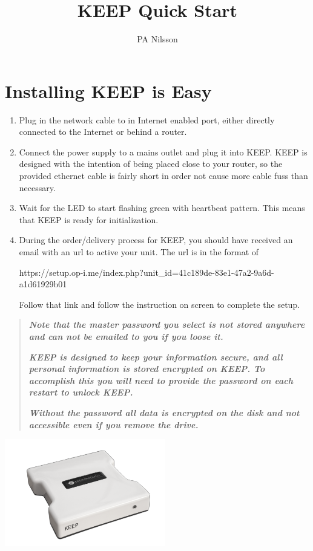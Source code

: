 \documentclass[12pt,a4paper,titlepage]{article}
\author{PA Nilsson}
\title{KEEP Quick Start}
\begin{document}
\FloatBarrier
\section{Installing KEEP is Easy}
	\begin{enumerate}

		\item Plug in the network cable to in Internet enabled port, either directly connected to the Internet or behind a router.

		\item Connect the power supply to a mains outlet and plug it into KEEP. KEEP is designed with the intention of being placed close to your router, so the provided ethernet cable is fairly short in order not cause more cable fuss than necessary.

		\item Wait for the LED to start flashing green with heartbeat pattern. This means that KEEP is ready for initialization.

		\item During the order/delivery process for KEEP, you should have received an email with an url to active your unit. The url is in the format of

\begin{small}
https://setup.op-i.me/index.php?unit\_id=41c189de-83e1-47a2-9a6d-a1d61929b01
\end{small}

Follow that link and follow the instruction on screen to complete the setup.

\end{enumerate}
\begin{quote}
\emph{\textbf{
Note that the master password you select is not stored anywhere and can not be emailed to you if you loose it.
}}

\emph{\textbf{
KEEP is designed to keep your information secure, and all personal information is stored encrypted on KEEP. To accomplish this you will need to provide the password on each restart to unlock KEEP.}}

\emph{\textbf{ Without the password all data is encrypted on the disk and not accessible even if you remove the drive.
}}
\end{quote}

\begin{center}
	\includegraphics[width=7cm]{./img/KEEP-front}
\end{center}
\end{document}
